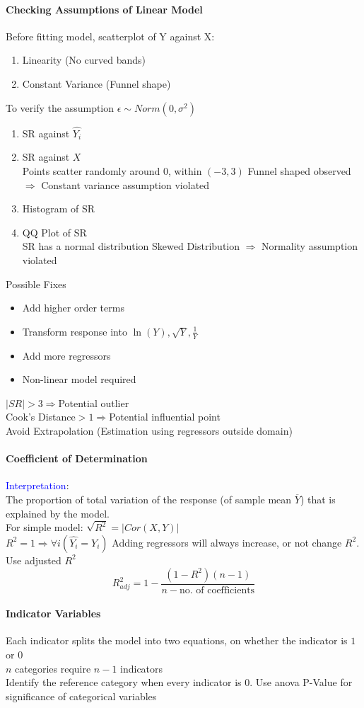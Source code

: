 \paragraph{Checking Assumptions of Linear Model}
Before fitting model, scatterplot of Y against X:
\begin{enumerate}
	\item Linearity (No curved bands)
	\item Constant Variance (Funnel shape)
\end{enumerate}
To verify the assumption $\epsilon\sim Norm(0,\sigma^2)$
\begin{enumerate}
	\item SR against $\hat{Y_i}$
	\item SR against $X$\\
		Points scatter randomly around 0, within $(-3, 3)$
		Funnel shaped observed $\Rightarrow$ Constant variance assumption violated
	\item Histogram of SR
	\item QQ Plot of SR\\
		SR has a normal distribution
		Skewed Distribution $\Rightarrow$ Normality assumption violated
\end{enumerate}
Possible Fixes
\begin{itemize}
	\item Add higher order terms
	\item Transform response into $\ln(Y),\sqrt{Y},\frac{1}{Y}$
	\item Add more regressors
	\item Non-linear model required
\end{itemize}
$\left|SR\right|>3\Rightarrow$Potential outlier\\
Cook's Distance$>1\Rightarrow$Potential influential point\\
Avoid Extrapolation (Estimation using regressors outside domain)
\paragraph{Coefficient of Determination}
\textcolor{Blue}{Interpretation}:\\
The proportion of total variation of the response (of sample mean
$\overline{Y}$) that is explained by the model.\\
For simple model: $\sqrt{R^2}=\left|Cor(X,Y)\right|$\\
$R^2=1\Rightarrow\forall i(\hat{Y_i}=Y_i)$
Adding regressors will always increase, or not change $R^2$. Use adjusted $R^2$
\[R_{adj}^2=1-\frac{(1-R^2)(n-1)}{n-\text{no. of coefficients}}\]
\paragraph{Indicator Variables}
Each indicator splits the model into two equations, on whether the indicator is $1$ or $0$\\
$n$ categories require $n-1$ indicators\\
Identify the reference category when every indicator is $0$.
Use anova P-Value for significance of categorical variables
